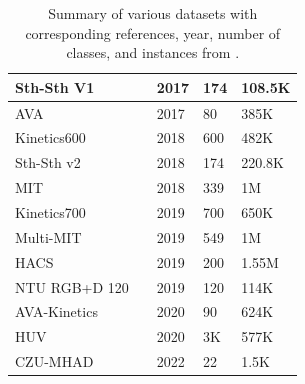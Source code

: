 \begin{table}
\begin{tabular}{|l|l|l|l|l|}
        Sth-Sth V1 & \textcite{dataset:something_something} & 2017 & 174 & 108.5K \\ \hline
        AVA & \textcite{gu2018avavideodatasetspatiotemporally} & 2017 & 80 & 385K \\ \hline
        Kinetics600 & \textcite{carreira_2017_i3d_quo_vadis} & 2018 & 600 & 482K \\ \hline
        Sth-Sth v2 & \textcite{dataset:something_something} & 2018 & 174 & 220.8K \\ \hline
        MIT & \textcite{monfort2021multimomentstimelearninginterpreting} & 2018 & 339 & 1M \\ \hline
        Kinetics700 & \textcite{carreira2022shortnotekinetics700human} & 2019 & 700 & 650K \\ \hline
        Multi-MIT & \textcite{monfort2021multimomentstimelearninginterpreting} & 2019 & 549 & 1M \\ \hline
        HACS & \textcite{dataset:hacs} & 2019 & 200 & 1.55M \\ \hline
        NTU RGB+D 120 & \textcite{Liu_2020} & 2019 & 120 & 114K \\ \hline
        AVA-Kinetics & \textcite{li2020avakineticslocalizedhumanactions} & 2020 & 90 & 624K \\ \hline
        HUV & \textcite{diba2020largescaleholisticvideo} & 2020 & 3K & 577K \\ \hline
        CZU-MHAD & \textcite{9707787} & 2022 & 22 & 1.5K \\ \hline
    \end{tabular}
    \caption{Summary of various datasets with corresponding references, year, number of classes, and instances from \textcite{survey_of_survey}.}
    \label{tab:datasets_summary}
\end{table}

